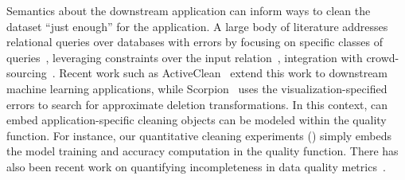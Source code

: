   Semantics about the downstream application can inform ways to clean the dataset ``just enough'' for the application.  
A large body of literature addresses relational queries over databases with errors by focusing on specific classes of queries~\cite{altwaijry2015query}, leveraging constraints over the input relation~\cite{2011Bertossi}, integration with crowd-sourcing~\cite{DBLP:conf/sigmod/BergmanMNT15}.   Recent work such as ActiveClean~\cite{DBLP:journals/pvldb/KrishnanWWFG16} extend this work to downstream machine learning applications, while Scorpion~\cite{DBLP:journals/pvldb/0002M13} uses the visualization-specified errors to search for approximate deletion transformations.   In this context, \sys can embed application-specific cleaning objects can be modeled within the quality function.  For instance, our quantitative cleaning experiments () simply embeds the model training and accuracy computation in the quality function. 
There has also been recent work on quantifying incompleteness in data quality metrics~\cite{chung2016data}.



